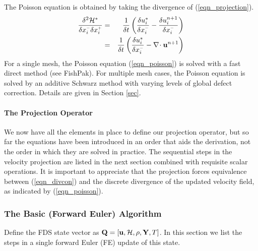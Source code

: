 \documentclass[11pt]{article}
\begin{document}
The Poisson equation is obtained by taking the divergence of (\ref{eqn_projection}).
\begin{eqnarray}
\label{eqn_poisson}
\frac{\delta^2 {\cal H}^{*}}{\delta x_i^{\scriptscriptstyle -}\delta x_i^{\scriptscriptstyle +}} &=& \frac{1}{\delta t}\left( \frac{\delta u_i^*}{\delta x_i^{\scriptscriptstyle -}} - \frac{\delta u_i^{n+1}}{\delta x_i^{\scriptscriptstyle -}} \right) \nonumber\\
&=& \frac{1}{\delta t}\left( \frac{\delta u_i^*}{\delta x_i^{\scriptscriptstyle -}} - \nabla\!\cdot \mathbf{u}^{n+1} \right)
\end{eqnarray}
For a single mesh, the Poisson equation (\ref{eqn_poisson}) is solved with a fast direct method (see FishPak).  For multiple mesh cases, the Poisson equation is solved by an additive Schwarz method with varying levels of global defect correction.  Details are given in Section \ref{sec}.

\paragraph{The Projection Operator} We now have all the elements in place to define our projection operator, but so far the equations have been introduced in an order that aids the derivation, not the order in which they are solved in practice.  The sequential steps in the velocity projection are listed in the next section combined with requisite scalar operations.  It is important to appreciate that the projection forces equivalence between (\ref{eqn_divcon}) and the discrete divergence of the updated velocity field, as indicated by (\ref{eqn_poisson}).


\subsubsection{The Basic (Forward Euler) Algorithm}

Define the FDS state vector as $\mathbf{Q} = [\mathbf{u},{\cal H},\rho,\mathbf{Y},T]$. In this section we list the steps in a single forward Euler (FE) update of this state.
\end{document}
